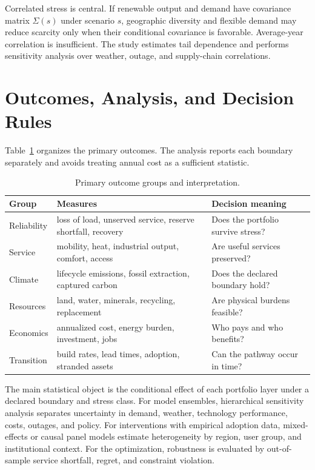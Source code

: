 \documentclass[conference]{IEEEtran}
\begin{document}
Correlated stress is central. If renewable output and demand have covariance matrix $\Sigma(s)$ under scenario $s$, geographic diversity and flexible demand may reduce scarcity only when their conditional covariance is favorable. Average-year correlation is insufficient. The study estimates tail dependence and performs sensitivity analysis over weather, outage, and supply-chain correlations.

\section{Outcomes, Analysis, and Decision Rules}
\label{sec:analysis}
Table~\ref{tab:outcomes} organizes the primary outcomes. The analysis reports each boundary separately and avoids treating annual cost as a sufficient statistic.

\begin{table}[t]
\centering
\caption{Primary outcome groups and interpretation.}
\label{tab:outcomes}
\scriptsize
\setlength{\tabcolsep}{2pt}
\begin{tabular}{>{\raggedright\arraybackslash}p{}>{\raggedright\arraybackslash}p{}>{\raggedright\arraybackslash}p{}}
\toprule
Group & Measures & Decision meaning\\
\midrule
Reliability & loss of load, unserved service, reserve shortfall, recovery & Does the portfolio survive stress?\\
Service & mobility, heat, industrial output, comfort, access & Are useful services preserved?\\
Climate & lifecycle emissions, fossil extraction, captured carbon & Does the declared boundary hold?\\
Resources & land, water, minerals, recycling, replacement & Are physical burdens feasible?\\
Economics & annualized cost, energy burden, investment, jobs & Who pays and who benefits?\\
Transition & build rates, lead times, adoption, stranded assets & Can the pathway occur in time?\\
\bottomrule
\end{tabular}
\end{table}

The main statistical object is the conditional effect of each portfolio layer under a declared boundary and stress class. For model ensembles, hierarchical sensitivity analysis separates uncertainty in demand, weather, technology performance, costs, outages, and policy. For interventions with empirical adoption data, mixed-effects or causal panel models estimate heterogeneity by region, user group, and institutional context. For the optimization, robustness is evaluated by out-of-sample service shortfall, regret, and constraint violation.
\end{document}
